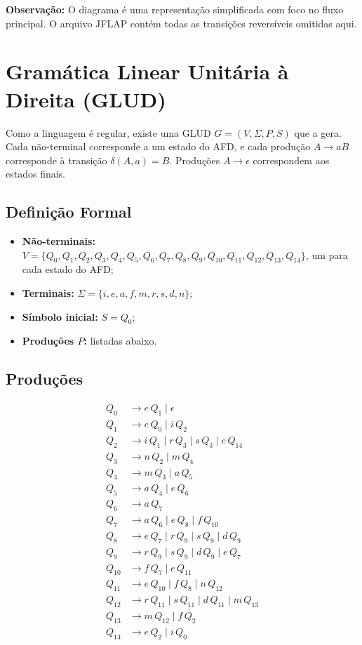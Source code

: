 \documentclass[12pt,a4paper]{article}
\begin{document}
\noindent\textbf{Observação:} O diagrama é uma representação simplificada com foco no fluxo principal. O arquivo JFLAP contém todas as transições reversíveis omitidas aqui.

\section{Gramática Linear Unitária à Direita (GLUD)}

Como a linguagem é regular, existe uma GLUD $G = (V, \Sigma, P, S)$ que a gera. Cada não-terminal corresponde a um estado do AFD, e cada produção $A \to a B$ corresponde à transição $\delta(A, a) = B$. Produções $A \to \epsilon$ correspondem aos estados finais.

\subsection{Definição Formal}
\begin{itemize}
    \item \textbf{Não-terminais:} $V = \{Q_0, Q_1, Q_2, Q_3, Q_4, Q_5, Q_6, Q_7, Q_8, Q_9, Q_{10}, Q_{11}, Q_{12}, Q_{13}, Q_{14}\}$, um para cada estado do AFD;
    \item \textbf{Terminais:} $\Sigma = \{i, e, a, f, m, r, s, d, n\}$;
    \item \textbf{Símbolo inicial:} $S = Q_0$;
    \item \textbf{Produções $P$:} listadas abaixo.
\end{itemize}

\subsection{Produções}

\begin{align*}
Q_0    &\to e\,Q_1 \mid \epsilon \\
Q_1    &\to e\,Q_0 \mid i\,Q_2 \\
Q_2    &\to i\,Q_1 \mid r\,Q_3 \mid s\,Q_3 \mid e\,Q_{14} \\
Q_3    &\to n\,Q_2 \mid m\,Q_4 \\
Q_4    &\to m\,Q_3 \mid a\,Q_5 \\
Q_5    &\to a\,Q_4 \mid e\,Q_6 \\
Q_6    &\to a\,Q_7 \\
Q_7    &\to a\,Q_6 \mid e\,Q_8 \mid f\,Q_{10} \\
Q_8    &\to e\,Q_7 \mid r\,Q_9 \mid s\,Q_9 \mid d\,Q_9 \\
Q_9    &\to r\,Q_9 \mid s\,Q_9 \mid d\,Q_9 \mid e\,Q_7 \\
Q_{10} &\to f\,Q_7 \mid e\,Q_{11} \\
Q_{11} &\to e\,Q_{10} \mid f\,Q_8 \mid n\,Q_{12} \\
Q_{12} &\to r\,Q_{11} \mid s\,Q_{11} \mid d\,Q_{11} \mid m\,Q_{13} \\
Q_{13} &\to m\,Q_{12} \mid f\,Q_2 \\
Q_{14} &\to e\,Q_2 \mid i\,Q_0
\end{align*}
\end{document}
